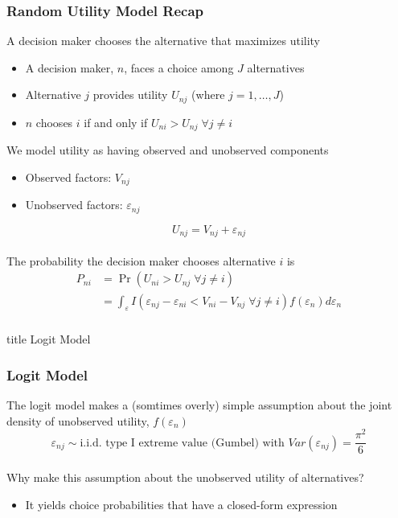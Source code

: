\documentclass{beamer}\usepackage[]{graphicx}\usepackage[]{color}
\begin{document}
\begin{frame}\frametitle{Random Utility Model Recap}
    A decision maker chooses the alternative that maximizes utility
    \begin{itemize}
		\item A decision maker, $n$, faces a choice among $J$ alternatives
    	\item Alternative $j$ provides utility $U_{nj}$ (where $j = 1, \ldots, J$)
    	\item $n$ chooses $i$ if and only if $U_{ni} > U_{nj} \; \forall j \neq i$
   	\end{itemize}
   	\vspace{2ex}
   	We model utility as having observed and unobserved components
   	\begin{itemize}
		\item Observed factors: $V_{nj}$
		\item Unobserved factors: $\varepsilon_{nj}$
	\end{itemize}
	$$U_{nj} = V_{nj} + \varepsilon_{nj}$$ \\
	\vspace{2ex}
	The probability the decision maker chooses alternative $i$ is
    \begin{align*}
    	P_{ni} &= \Pr(U_{ni} > U_{nj} \; \forall j \neq i) \\
    	&= \int_\varepsilon I(\varepsilon_{nj} - \varepsilon_{ni} < V_{ni} - V_{nj} \; \forall j \neq i) f(\varepsilon_n) d\varepsilon_n
    \end{align*}
\end{frame}

\begin{frame}\frametitle{}
    \vfill
    \centering
    \begin{beamercolorbox}[center]{title}
        \Large Logit Model
    \end{beamercolorbox}
    \vfill
\end{frame}

\begin{frame}\frametitle{Logit Model}
    The logit model makes a (somtimes overly) simple assumption about the joint density of unobserved utility, $f(\varepsilon_n)$
    $$\varepsilon_{nj} \sim \text{i.i.d.\ type I extreme value (Gumbel) with } Var(\varepsilon_{nj}) = \frac{\pi^2}{6}$$ \\
    \vspace{3ex}
    Why make this assumption about the unobserved utility of alternatives?
    \begin{itemize}
    	\item It yields choice probabilities that have a closed-form expression
    \end{itemize}
\end{frame}
\end{document}
